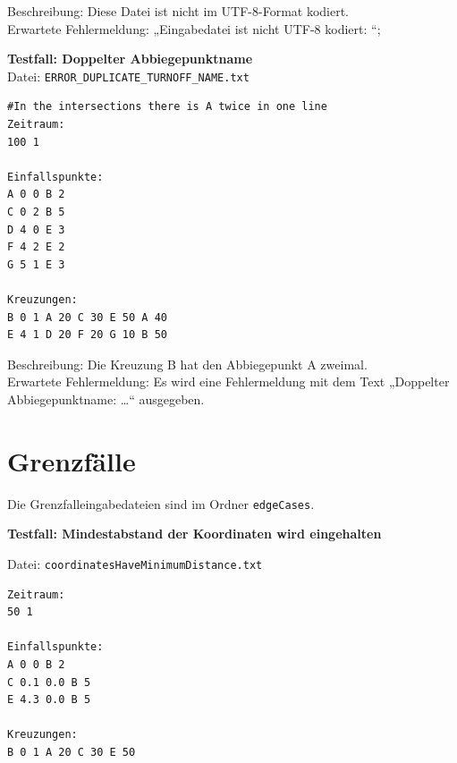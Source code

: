 \begin{figure}[h!]
    \centering
\end{figure}

Beschreibung: Diese Datei ist nicht im UTF-8-Format kodiert. \\
Erwartete Fehlermeldung: „Eingabedatei ist nicht UTF-8 kodiert: “;

\textbf{Testfall: Doppelter Abbiegepunktname} \\
Datei: \texttt{ERROR\_DUPLICATE\_TURNOFF\_NAME.txt}
\begin{lstlisting}
#In the intersections there is A twice in one line
Zeitraum:
100 1

Einfallspunkte:
A 0 0 B 2
C 0 2 B 5
D 4 0 E 3
F 4 2 E 2
G 5 1 E 3

Kreuzungen:
B 0 1 A 20 C 30 E 50 A 40
E 4 1 D 20 F 20 G 10 B 50
\end{lstlisting}

Beschreibung: Die Kreuzung B hat den Abbiegepunkt A zweimal. \\
Erwartete Fehlermeldung: Es wird eine Fehlermeldung mit dem Text „Doppelter Abbiegepunktname: …“ ausgegeben.

\clearpage
\section{Grenzfälle}
Die Grenzfalleingabedateien sind im Ordner \texttt{edgeCases}.

\textbf{Testfall: Mindestabstand der Koordinaten wird eingehalten}

Datei: \texttt{coordinatesHaveMinimumDistance.txt}
\begin{lstlisting}
Zeitraum:
50 1

Einfallspunkte:
A 0 0 B 2
C 0.1 0.0 B 5
E 4.3 0.0 B 5

Kreuzungen:
B 0 1 A 20 C 30 E 50
\end{lstlisting}

